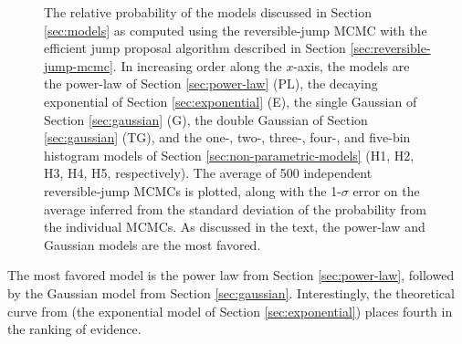 \documentclass[preprint]{aastex}
\begin{document}
\begin{figure}
  \begin{center}
  \end{center}
  \caption{\label{fig:rj} The relative probability of the models
    discussed in Section \ref{sec:models} as computed using the
    reversible-jump MCMC with the efficient jump proposal algorithm
    described in Section \ref{sec:reversible-jump-mcmc}.  In
    increasing order along the $x$-axis, the models are the power-law
    of Section \ref{sec:power-law} (PL), the decaying exponential of
    Section \ref{sec:exponential} (E), the single Gaussian of Section
    \ref{sec:gaussian} (G), the double Gaussian of Section
    \ref{sec:gaussian} (TG), and the one-, two-, three-, four-, and
    five-bin histogram models of Section
    \ref{sec:non-parametric-models} (H1, H2, H3, H4, H5,
    respectively).  The average of 500 independent reversible-jump
    MCMCs is plotted, along with the 1-$\sigma$ error on the average
    inferred from the standard deviation of the probability from the
    individual MCMCs.  As discussed in the text, the power-law and
    Gaussian models are the most favored.}
\end{figure}

The most favored model is the power law from Section
\ref{sec:power-law}, followed by the Gaussian model from Section
\ref{sec:gaussian}.  Interestingly, the theoretical curve from
\citet{Fryer2001} (the exponential model of Section
\ref{sec:exponential}) places fourth in the ranking of evidence.
\end{document}
